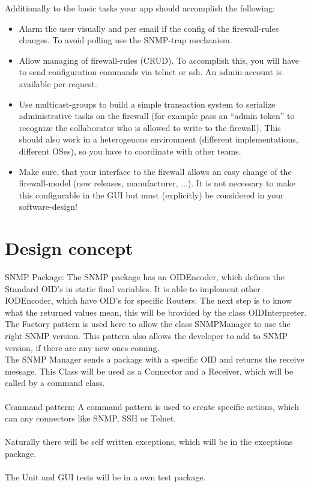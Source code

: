 \documentclass[a4paper,12pt]{scrreprt}
\begin{document}
Additionally to the basic tasks your app should accomplish the following:
\begin{itemize}


    \item Alarm the user visually and per email if the config of the firewall-rules changes. To avoid polling use the SNMP-trap mechanism.

    \item Allow managing of firewall-rules (CRUD). To accomplish this, you will have to send configuration commands via telnet or ssh. An admin-account is available per request.

    \item Use multicast-groups to build a simple transaction system to serialize administrative tasks on the firewall (for example pass an “admin token” to recognize the collaborator who is allowed to write to the firewall). This should also work in a heterogenous environment (different implementations, different OSes), so you have to coordinate with other teams.

    \item Make sure, that your interface to the firewall allows an easy change of the firewall-model (new releases, manufacturer, ...). It is not necessary to make this configurable in the GUI but must (explicitly) be considered in your software-design!
\end{itemize}

	
\chapter{Design concept}
	SNMP Package:
	The SNMP package has an OIDEncoder, which defines the Standard OID's in static final variables. It is able to implement other IODEncoder, which have OID's for specific Routers. 
	The next step is to know what the returned values mean, this will be brovided by the class OIDInterpreter.
	\\
	The Factory pattern is used here to allow the class SNMPManager to use the right SNMP version. This pattern also allows the developer to add to SNMP version, if there are any new ones coming.
	\\
	The SNMP Manager sends a package with a specific OID and returns the receive message. This Class will be used as a Connector and a Receiver, which will be called by a command class.
	\\\\
	Command pattern:
	A command pattern is used to create specific actions, which can any connectors like SNMP, SSH or Telnet.
	\\\\
	Naturally there will be self written exceptions, which will be in the exceptions package.
	\\\\
	The Unit and GUI tests will be in a own test package.   
\end{document}

